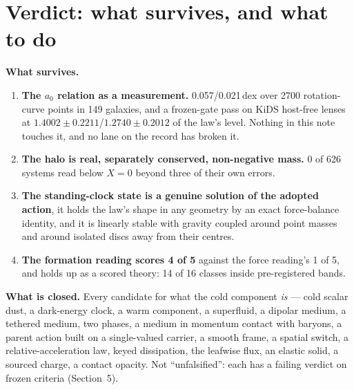 \documentclass[10pt]{article}
\begin{document}
\section{Verdict: what survives, and what to do}

\textbf{What survives.}
\begin{enumerate}
\item \textbf{The $a_0$ relation as a measurement.} 0.057/0.021\,dex over 2700 rotation-curve points in 149 galaxies,
  and a frozen-gate pass on KiDS host-free lenses at $1.4002\pm0.2211$/$1.2740\pm0.2012$ of the law's level.
  Nothing in this note touches it, and no lane on the record has broken it.
\item \textbf{The halo is real, separately conserved, non-negative mass.} 0 of 626 systems read below $X=0$ beyond three
  of their own errors.
\item \textbf{The standing-clock state is a genuine solution of the adopted action}, it holds the law's shape in any
  geometry by an exact force-balance identity, and it is linearly stable with gravity coupled around point masses and
  around isolated discs away from their centres.
\item \textbf{The formation reading scores 4 of 5} against the force reading's 1 of 5, and holds up as a scored
  theory: 14 of 16 classes inside pre-registered bands.
\end{enumerate}

\textbf{What is closed.} Every candidate for what the cold component {\it is} --- cold scalar dust, a dark-energy clock,
a warm component, a superfluid, a dipolar medium, a tethered medium, two phases, a medium in momentum contact with
baryons, a parent action built on a single-valued carrier, a smooth frame, a spatial switch, a relative-acceleration
law, keyed dissipation, the leafwise flux, an elastic solid, a sourced charge, a contact opacity. Not ``unfalsified'':
each has a failing verdict on frozen criteria (Section~5).
\end{document}
